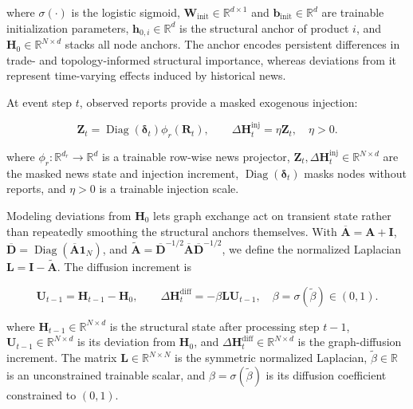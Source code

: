 \documentclass[letterpaper]{article} %
\begin{document}
where \(\sigma(\cdot)\) is the logistic sigmoid, \(\mathbf W_{\mathrm{init}}\in\mathbb R^{d\times1}\) and \(\mathbf b_{\mathrm{init}}\in\mathbb R^d\) are trainable initialization parameters, \(\mathbf h_{0,i}\in\mathbb R^d\) is the structural anchor of product \(i\), and \(\mathbf H_0\in\mathbb R^{N\times d}\) stacks all node anchors. The anchor encodes persistent differences in trade- and topology-informed structural importance, whereas deviations from it represent time-varying effects induced by historical news.

At event step \(t\), observed reports provide a masked exogenous injection:

\begin{equation}
\mathbf Z_t
=\operatorname{Diag}(\boldsymbol\delta_t)\phi_r(\mathbf R_t),
\qquad
\Delta\mathbf H_t^{\mathrm{inj}}
=\eta\mathbf Z_t,\quad \eta>0.
\label{eq:news-injection}
\end{equation}

where \(\phi_r:\mathbb R^{d_r}\rightarrow\mathbb R^d\) is a trainable row-wise news projector, \(\mathbf Z_t,\Delta\mathbf H_t^{\mathrm{inj}}\in\mathbb R^{N\times d}\) are the masked news state and injection increment, \(\operatorname{Diag}(\boldsymbol\delta_t)\) masks nodes without reports, and \(\eta>0\) is a trainable injection scale.

Modeling deviations from \(\mathbf H_0\) lets graph exchange act on transient state rather than repeatedly smoothing the structural anchors themselves. With \(\overline{\mathbf A}=\mathbf A+\mathbf I\), \(\overline{\mathbf D}=\operatorname{Diag}(\overline{\mathbf A}\mathbf1_N)\), and \(\widetilde{\mathbf A}=\overline{\mathbf D}^{-1/2}\overline{\mathbf A}\overline{\mathbf D}^{-1/2}\), we define the normalized Laplacian \(\mathbf L=\mathbf I-\widetilde{\mathbf A}\). The diffusion increment is

\begin{equation}
\mathbf U_{t-1}=\mathbf H_{t-1}-\mathbf H_0,\qquad
\Delta\mathbf H_t^{\mathrm{diff}}
=-\beta\mathbf L\mathbf U_{t-1},
\quad \beta=\sigma(\widetilde\beta)\in(0,1).
\label{eq:diffusion}
\end{equation}

where \(\mathbf H_{t-1}\in\mathbb R^{N\times d}\) is the structural state after processing step \(t-1\), \(\mathbf U_{t-1}\in\mathbb R^{N\times d}\) is its deviation from \(\mathbf H_0\), and \(\Delta\mathbf H_t^{\mathrm{diff}}\in\mathbb R^{N\times d}\) is the graph-diffusion increment. The matrix \(\mathbf L\in\mathbb R^{N\times N}\) is the symmetric normalized Laplacian, \(\widetilde\beta\in\mathbb R\) is an unconstrained trainable scalar, and \(\beta=\sigma(\widetilde\beta)\) is its diffusion coefficient constrained to \((0,1)\).
\end{document}
